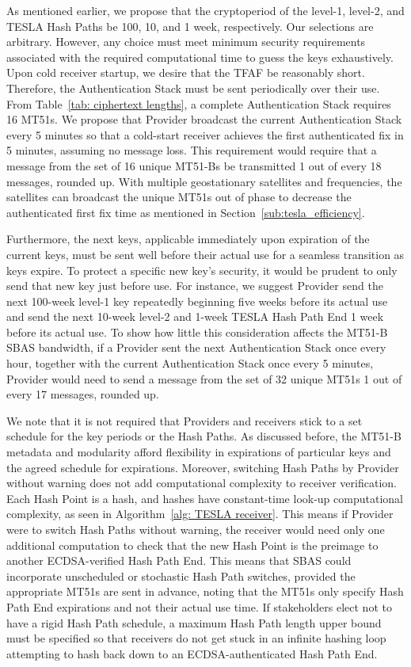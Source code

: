 \documentclass[letterpaper,times]{IONconf/IONconf}
\begin{document}
		As mentioned earlier, we propose that the cryptoperiod of the level-1, level-2, and TESLA Hash Paths be 100, 10, and 1 week, respectively.
		Our selections are arbitrary.
		However,  any choice must meet minimum security requirements associated with the required computational time to guess the keys exhaustively.
		Upon cold receiver startup, we desire that the TFAF be reasonably short.
		Therefore, the Authentication Stack must be sent periodically over their use.
		From Table~\ref{tab: ciphertext lengths}, a complete Authentication Stack requires 16 MT51s. 
		We propose that Provider broadcast the current Authentication Stack every 5 minutes so that a cold-start receiver achieves the first authenticated fix in 5 minutes, assuming no message loss.
		This requirement would require that a message from the set of 16 unique MT51-Bs be transmitted 1 out of every 18 messages, rounded up.
		With multiple geostationary satellites and frequencies, the satellites can broadcast the unique MT51s out of phase to decrease the authenticated first fix time as mentioned in Section~\ref{sub:tesla_efficiency}.

		Furthermore, the next keys, applicable immediately upon expiration of the current keys, must be sent well before their actual use for a seamless transition as keys expire.
		To protect a specific new key's security, it would be prudent to only send that new key just before use.
		For instance, we suggest Provider send the next 100-week level-1 key repeatedly beginning five weeks before its actual use and send the next 10-week level-2 and 1-week TESLA Hash Path End 1 week before its actual use.
		To show how little this consideration affects the MT51-B SBAS bandwidth, if a Provider sent the next Authentication Stack once every hour, together with the current Authentication Stack once every 5 minutes, Provider would need to send a message from the set of 32 unique MT51s 1 out of every 17 messages, rounded up.

		We note that it is not required that Providers and receivers stick to a set schedule for the key periods or the Hash Paths.
		As discussed before, the MT51-B metadata and modularity afford flexibility in expirations of particular keys and the agreed schedule for expirations.
		Moreover, switching Hash Paths by Provider without warning does not add computational complexity to receiver verification.
		Each Hash Point is a hash, and hashes have constant-time look-up computational complexity, as seen in Algorithm~\ref{alg: TESLA receiver}.
		This means if Provider were to switch Hash Paths without warning, the receiver would need only one additional computation to check that the new Hash Point is the preimage to another ECDSA-verified Hash Path End.
		This means that SBAS could incorporate unscheduled or stochastic Hash Path switches, provided the appropriate MT51s are sent in advance, noting that the MT51s only specify Hash Path End expirations and not their actual use time.
		If stakeholders elect not to have a rigid Hash Path schedule, a maximum Hash Path length upper bound must be specified so that receivers do not get stuck in an infinite hashing loop attempting to hash back down to an ECDSA-authenticated Hash Path End.
\end{document}
